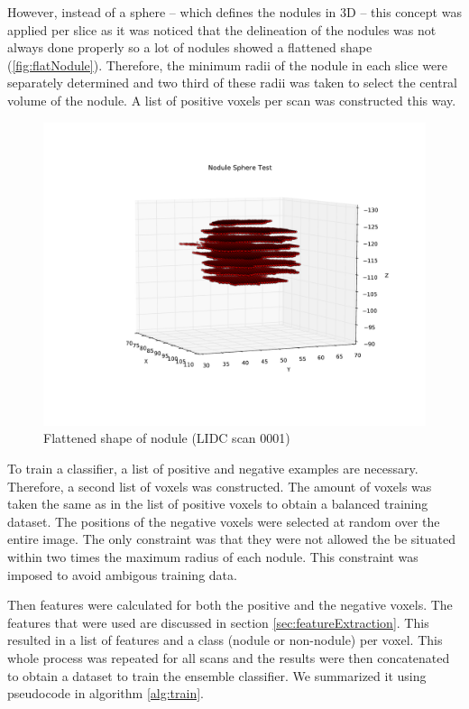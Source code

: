 However, instead of a sphere -- which defines the nodules in 3D -- this concept
was applied per slice as it was noticed that the delineation of the nodules was
not always done properly so a lot of nodules showed a flattened shape
(\autoref{fig:flatNodule}).
Therefore, the minimum radii of the nodule in each slice were separately
determined and two third of these radii was taken to select the central volume
of the nodule. A list of positive voxels per scan was constructed this way.
\begin{figure}[htp]
 \begin{center}
    \includegraphics[width=\linewidth]{img/NoduleSphereTest_0001.pdf}
    \caption{Flattened shape of nodule (LIDC scan 0001)}
    \label{fig:flatNodule}
 \end{center}
\end{figure}

To train a classifier, a list of positive and negative
examples are necessary. Therefore, a second list of voxels was constructed. The
amount of voxels was taken the same as in the list of positive voxels to obtain
a balanced training dataset. The positions of the negative voxels were selected
at random over the entire image. The only constraint was that they were not
allowed the be situated within two times the maximum radius of each nodule. This
constraint was imposed to avoid ambigous training data.

Then features were calculated for both the positive and the negative voxels. The
features that were used are discussed in section \ref{sec:featureExtraction}.
This resulted in a list of features and a class (nodule or non-nodule) per
voxel. This whole process was repeated for all scans and the results were then
concatenated to obtain a dataset to train the ensemble classifier. We summarized
it using pseudocode in algorithm \ref{alg:train}.

